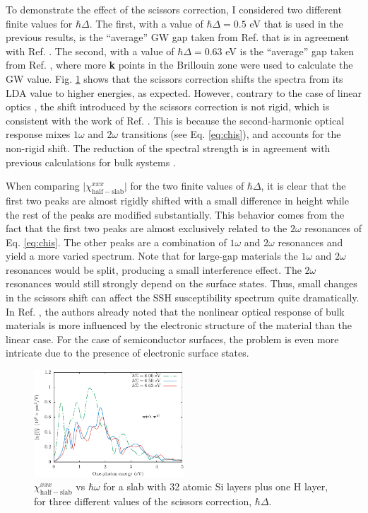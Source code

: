 To demonstrate the effect of the scissors correction, I considered two different
finite values for $\hbar\Delta$. The first, with a value of $\hbar\Delta=0.5$ eV
that is used in the previous results, is the ``average'' GW gap taken from Ref.
\cite{rohlfingPRB95} that is in agreement with Ref. \cite{garciaCPC01}. The
second, with a value of $\hbar\Delta=0.63$ eV is the ``average'' gap taken from
Ref. \cite{asahiPRB00}, where more \textbf{k} points in the Brillouin zone were
used to calculate the GW value. Fig. \ref{fig:scissors} shows that the scissors
correction shifts the spectra from its LDA value to higher energies, as
expected. However, contrary to the case of linear optics \cite{cabellosPRB09},
the shift introduced by the scissors correction is not rigid, which is
consistent with the work of Ref. \cite{nastosPRB05}. This is because the
second-harmonic optical response mixes $1\omega$ and $2\omega$ transitions (see
Eq. \eqref{eq:chis}), and accounts for the non-rigid shift. The reduction of the
spectral strength is in agreement with previous calculations for bulk systems
\cite{nastosPRB05, luppiPRB10, leitsmannPRB05}.

When comparing $\vert\chi^{xxx}_{\mathrm{half-slab}}\vert$ for the two finite
values of $\hbar\Delta$, it is clear that the first two peaks are almost rigidly
shifted with a small difference in height while the rest of the peaks are
modified substantially. This behavior comes from the fact that the first two
peaks are almost exclusively related to the $2\omega$ resonances of Eq.
\eqref{eq:chis}. The other peaks are a combination of $1\omega$ and $2\omega$
resonances and yield a more varied spectrum. Note that for large-gap materials
the $1\omega$ and $2\omega$ resonances would be split, producing a small
interference effect. The $2\omega$ resonances would still strongly depend on the
surface states. Thus, small changes in the scissors shift can affect the SSH
susceptibility spectrum quite dramatically. In Ref. \cite{adolphPRB00}, the
authors already noted that the nonlinear optical response of bulk materials is
more influenced by the electronic structure of the material than the linear
case. For the case of semiconductor surfaces, the problem is even more intricate
due to the presence of electronic surface states.

\begin{figure}[H]
\centering 
\includegraphics[width=0.5\textwidth]{content/figures/fig-Si2x1-scissors}
\caption{$\chi^{xxx}_{\mathrm{half-slab}}$ vs $\hbar\omega$ for a slab with 32
atomic Si layers plus one H layer, for three different values of the scissors
correction, $\hbar\Delta$.
\label{fig:scissors}} 
\end{figure}

